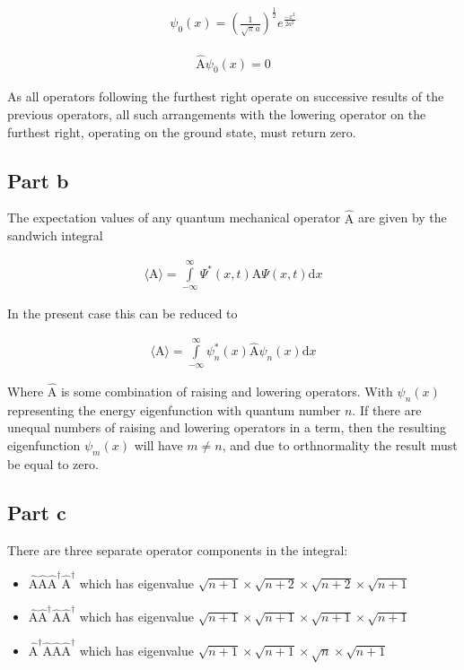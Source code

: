 \documentclass[paper=a4, fontsize=11pt]{scrartcl} %
\numberwithin{equation}{section} %
\numberwithin{figure}{section} %
\numberwithin{table}{section} %
\begin{document}
\begin{align}
\psi_0 (x) =
\left(\frac{1}{\sqrt{\pi}a}\right)^{\frac{1}{2}}
e^{\frac{-x^2}{2a^2}}
\end{align}

\begin{align}
\hat{\textrm{A}}\psi_0 (x) = 0
\end{align}

As all operators following the furthest right operate on successive results of the previous operators, all such arrangements with the lowering operator on the furthest right, operating on the ground state, must return zero.

\subsection{Part b}
The expectation values of any quantum mechanical operator $\hat{\textrm{A}}$ are given by the sandwich integral

\begin{align}
\langle \textrm{A} \rangle =
\int\limits_{-\infty}^{\infty}\Psi^*\left(x,t\right) \hat{\textrm{A}} \Psi\left(x,t\right) \mathrm{d}x
\end{align}

In the present case this can be reduced to

\begin{align}
\langle \textrm{A} \rangle =
\int\limits_{-\infty}^{\infty}\psi^*_n\left(x\right) \hat{\textrm{A}} \psi_n\left(x\right) \mathrm{d}x
\end{align}

Where $\hat{\textrm{A}}$ is some combination of raising and lowering operators. With $\psi_n(x)$ representing the energy eigenfunction with quantum number $n$. If there are unequal numbers of raising and lowering operators in a term, then the resulting eigenfunction $\psi_m(x)$ will have $m \neq n$, and due to orthnormality the result must be equal to zero.

\subsection{Part c}
There are three separate operator components in the integral:\begin{itemize}
\item{
 $\hat{\textrm{A}}\hat{\textrm{A}}
\hat{\textrm{A}}^{\dagger}\hat{\textrm{A}}^{\dagger}$
which has eigenvalue $\sqrt{n+1}\times \sqrt{n+2}\times \sqrt{n+2}\times \sqrt{n+1}$}
\item{
$\hat{\textrm{A}}\hat{\textrm{A}}^{\dagger}
\hat{\textrm{A}}\hat{\textrm{A}}^{\dagger}$
which has eigenvalue $\sqrt{n+1}\times \sqrt{n+1}\times \sqrt{n+1}\times \sqrt{n+1}$}
\item{
$\hat{\textrm{A}}^{\dagger}\hat{\textrm{A}}
\hat{\textrm{A}}\hat{\textrm{A}}^{\dagger}$
which has eigenvalue $\sqrt{n+1}\times \sqrt{n+1}\times \sqrt{n}\times \sqrt{n+1}$}

\end{itemize}
\end{document}
